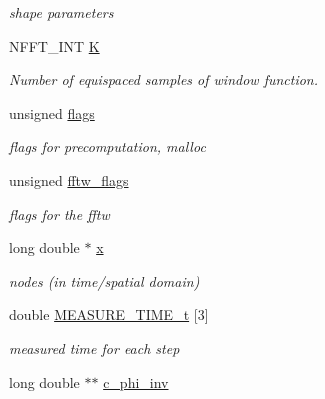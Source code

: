 \begin{DoxyCompactItemize}
\begin{DoxyCompactList}\small\item\em shape parameters \end{DoxyCompactList}\item 
N\-F\-F\-T\-\_\-\-I\-N\-T \hyperlink{structnfstl__plan_a2fd14975632f1894db472ee71f962c33}{K}
\begin{DoxyCompactList}\small\item\em Number of equispaced samples of window function. \end{DoxyCompactList}\item 
\hypertarget{structnfstl__plan_afd22e287250a0e9c35212e333c9d572b}{unsigned \hyperlink{structnfstl__plan_afd22e287250a0e9c35212e333c9d572b}{flags}}\label{structnfstl__plan_afd22e287250a0e9c35212e333c9d572b}

\begin{DoxyCompactList}\small\item\em flags for precomputation, malloc \end{DoxyCompactList}\item 
\hypertarget{structnfstl__plan_a0ab6b3ec18b7e0685277d5f6997aa54c}{unsigned \hyperlink{structnfstl__plan_a0ab6b3ec18b7e0685277d5f6997aa54c}{fftw\-\_\-flags}}\label{structnfstl__plan_a0ab6b3ec18b7e0685277d5f6997aa54c}

\begin{DoxyCompactList}\small\item\em flags for the fftw \end{DoxyCompactList}\item 
\hypertarget{structnfstl__plan_af663d590a277872d6e0e777cb410edbb}{long double $\ast$ \hyperlink{structnfstl__plan_af663d590a277872d6e0e777cb410edbb}{x}}\label{structnfstl__plan_af663d590a277872d6e0e777cb410edbb}

\begin{DoxyCompactList}\small\item\em nodes (in time/spatial domain) \end{DoxyCompactList}\item 
\hypertarget{structnfstl__plan_a47c6a3aba310b4f18d7ba5a7107fc168}{double \hyperlink{structnfstl__plan_a47c6a3aba310b4f18d7ba5a7107fc168}{M\-E\-A\-S\-U\-R\-E\-\_\-\-T\-I\-M\-E\-\_\-t} \mbox{[}3\mbox{]}}\label{structnfstl__plan_a47c6a3aba310b4f18d7ba5a7107fc168}

\begin{DoxyCompactList}\small\item\em measured time for each step \end{DoxyCompactList}\item 
\hypertarget{structnfstl__plan_a7fdb409271e18f5dec1ac622af10d32a}{long double $\ast$$\ast$ \hyperlink{structnfstl__plan_a7fdb409271e18f5dec1ac622af10d32a}{c\-\_\-phi\-\_\-inv}}\label{structnfstl__plan_a7fdb409271e18f5dec1ac622af10d32a}


\end{DoxyCompactItemize}
